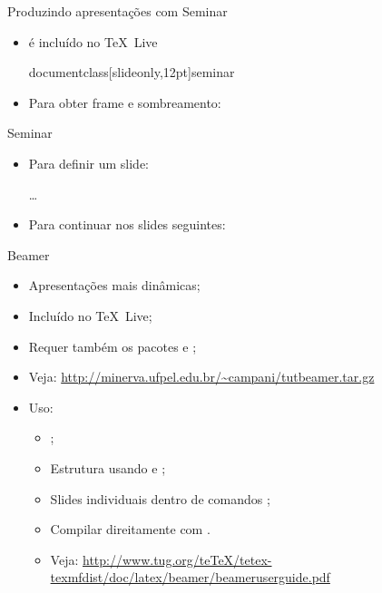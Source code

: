 
\begin{frame}{Produzindo apresentações com Seminar}
\begin{itemize}
\item {} é incluído no \TeX\ Live
\begin{LaTeXcode}[Declaração]
\LOA documentclass[slideonly,12pt]{seminar}
\end{LaTeXcode}
\item Para obter frame e sombreamento:
\begin{LaTeXcode}
\n
{}
\end{LaTeXcode}
\end{itemize}
\end{frame}

\begin{frame}{Seminar}

\begin{itemize}
\item Para definir um slide:
\begin{LaTeXcode}[Slide]
\n
\dots\n
{}
\end{LaTeXcode}
\item Para continuar nos slides seguintes:
\begin{LaTeXcode}
\end{LaTeXcode}
\end{itemize}
\end{frame}

\begin{frame}{Beamer}
\begin{itemize}
\item Apresentações mais dinâmicas;
\item Incluído no \TeX\ Live;
\item Requer também os pacotes  e ;
\item Veja: \url{http://minerva.ufpel.edu.br/~campani/tutbeamer.tar.gz}
\item Uso:
\begin{itemize}
\item {};
\item Estrutura usando  e ;
\item Slides individuais dentro de comandos ;
\item Compilar direitamente com .
\item Veja: \url{http://www.tug.org/teTeX/tetex-texmfdist/doc/latex/beamer/beameruserguide.pdf}
\end{itemize}
\end{itemize}

\end{frame}

